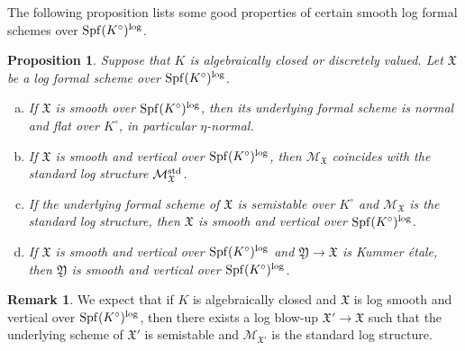 \documentclass[a4paper,twoside,11pt,reqno]{amsart}
\newcommand{\cM}{{\mathcal M}}
\newcommand{\fX}{{\mathfrak{X}}}
\newcommand{\fY}{{\mathfrak{Y}}}
\DeclareMathOperator{\Spf}{Spf}
\newtheorem{prop}[thm]{Proposition}
\theoremstyle{definition}
\newtheorem{rmk}[thm]{Remark}
\numberwithin{equation}{subsection}
\begin{document}
The following proposition lists some good properties of certain smooth log formal schemes over $\Spf(K^\circ)^{\rm log}$.

\begin{prop} \label{prop:log-sm-vertical}
    Suppose that $K$ is algebraically closed or discretely valued. Let $\fX$ be a log formal scheme over $\Spf(K^\circ)^{\rm log}$.
    \begin{enumerate}[(a)]
        \item \label{propitem:log-sm-vertical-a}
        If $\fX$ is smooth over $\Spf(K^\circ)^{\rm log}$, then its underlying formal scheme is normal and flat over $K^\circ$, in particular $\eta$-normal.
        
        \item \label{propitem:log-sm-vertical-b}
        If $\fX$ is smooth and vertical over $\Spf(K^\circ)^{\rm log}$, then $\cM_\fX$ coincides with the standard log structure $\cM^{\rm std}_\fX$.
        
        \item \label{propitem:log-sm-vertical-c}
        If the underlying formal scheme of $\fX$ is semistable over $K^\circ$ and $\cM_\fX$ is the standard log structure, then $\fX$ is smooth and vertical over $\Spf(K^\circ)^{\rm log}$. 
        
        \item \label{propitem:log-sm-vertical-d}
        If $\fX$ is smooth and vertical over $\Spf(K^\circ)^{\rm log}$ and $\fY\to \fX$ is Kummer \'etale, then $\fY$ is smooth and vertical over $\Spf(K^\circ)^{\rm log}$.
    \end{enumerate}
\end{prop}

\begin{rmk}
We expect that if $K$ is algebraically closed and $\fX$ is log smooth and vertical over $\Spf(K^\circ)^{\rm log}$, then there exists a log blow-up $\fX'\to\fX$ such that the underlying scheme of $\fX'$ is semistable and $\cM_{\fX'}$ is the standard log structure.
\end{rmk}
\end{document}
